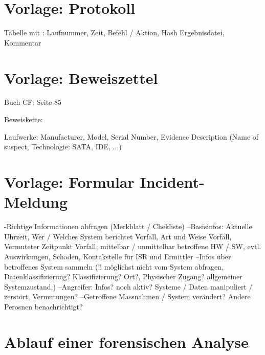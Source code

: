 
%



\chapter{Vorlage: Protokoll}


Tabelle mit : Laufnummer, Zeit, Befehl / Aktion, Hash Ergebnisdatei, Kommentar


\chapter{Vorlage: Beweiszettel}
Buch CF: Seite 85

Beweiskette:

Laufwerke: Manufacturer, Model, Serial Number, Evidence Description (Name of suspect, Technologie: SATA, IDE, ...)


\chapter{Vorlage: Formular Incident-Meldung}
-Richtige Informationen abfragen (Merkblatt / Chekliste)
--Basisinfos: Aktuelle Uhrzeit, Wer / Welches System berichtet Vorfall, Art und Weise Vorfall, Vermuteter Zeitpunkt Vorfall, mittelbar / unmittelbar betroffene HW / SW, evtl. Auswirkungen, Schaden, Kontakstelle für ISR und Ermittler
--Infos über betroffenes System sammeln (!! möglichst nicht vom System abfragen, Datenklassifizierung? Klassifizierung? Ort?, Physischer Zugang?  allgemeiner Systemzustand,)
--Angreifer: Infos? noch aktiv? Systeme / Daten manipuliert / zerstört, Vermutungen?
--Getroffene Massnahmen / System verändert? Andere Perosnen benachrichtigt?


\chapter{Ablauf einer forensischen Analyse}
